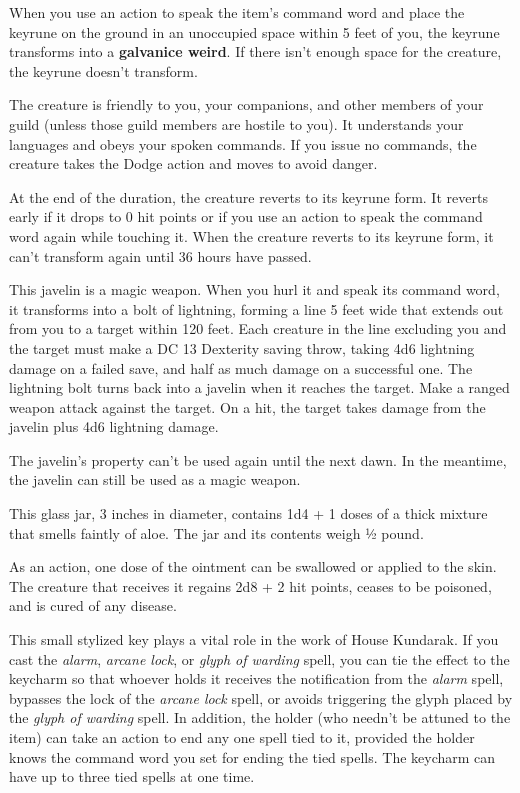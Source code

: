 \documentclass[10pt,a4paper,twoside,bg=print,twocolumn,openany,nodeprecatedcode]{dndbook}
\begin{document}
When you use an action to speak the item's command word and place the keyrune on the ground in an unoccupied space within 5 feet of you, the keyrune transforms into a \textbf{galvanice weird}. If there isn't enough space for the creature, the keyrune doesn't transform.

The creature is friendly to you, your companions, and other members of your guild (unless those guild members are hostile to you). It understands your languages and obeys your spoken commands. If you issue no commands, the creature takes the Dodge action and moves to avoid danger.

At the end of the duration, the creature reverts to its keyrune form. It reverts early if it drops to 0 hit points or if you use an action to speak the command word again while touching it. When the creature reverts to its keyrune form, it can't transform again until 36 hours have passed.

This javelin is a magic weapon. When you hurl it and speak its command word, it transforms into a bolt of lightning, forming a line 5 feet wide that extends out from you to a target within 120 feet. Each creature in the line excluding you and the target must make a DC 13 Dexterity saving throw, taking 4d6 lightning damage on a failed save, and half as much damage on a successful one. The lightning bolt turns back into a javelin when it reaches the target. Make a ranged weapon attack against the target. On a hit, the target takes damage from the javelin plus 4d6 lightning damage.

The javelin's property can't be used again until the next dawn. In the meantime, the javelin can still be used as a magic weapon.

This glass jar, 3 inches in diameter, contains 1d4 + 1 doses of a thick mixture that smells faintly of aloe. The jar and its contents weigh ½ pound.

As an action, one dose of the ointment can be swallowed or applied to the skin. The creature that receives it regains 2d8 + 2 hit points, ceases to be poisoned, and is cured of any disease.

This small stylized key plays a vital role in the work of House Kundarak. If you cast the \textit{alarm}, \textit{arcane lock}, or \textit{glyph of warding} spell, you can tie the effect to the keycharm so that whoever holds it receives the notification from the \textit{alarm} spell, bypasses the lock of the \textit{arcane lock} spell, or avoids triggering the glyph placed by the \textit{glyph of warding} spell. In addition, the holder (who needn't be attuned to the item) can take an action to end any one spell tied to it, provided the holder knows the command word you set for ending the tied spells. The keycharm can have up to three tied spells at one time.
\end{document}

